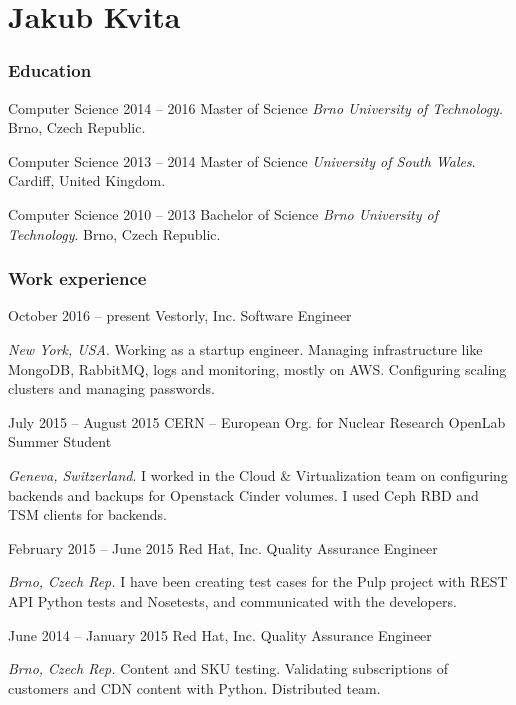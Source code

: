 \documentclass{tccv}
\begin{document}
\part{Jakub Kvita}

\section{Education}

\begin{yearlist}
	
	\item[Computer Science]{2014 -- 2016}
	{Master of Science}
	{\emph{Brno University of Technology}. Brno, Czech Republic.}
	
	\item[Computer Science]{2013 -- 2014}
	{Master of Science}
	{\emph{University of South Wales}. Cardiff, United Kingdom.}
	
	\item[Computer Science]{2010 -- 2013}
	{Bachelor of Science}
	{\emph{Brno University of Technology}. Brno, Czech Republic.}
	
\end{yearlist}

\section{Work experience}

\begin{eventlist}

\item{October 2016 -- present}
{Vestorly, Inc.}
{Software Engineer}

\emph{New York, USA}. Working as a startup engineer. Managing infrastructure like MongoDB, RabbitMQ, logs and monitoring, mostly on AWS. Configuring scaling clusters and managing passwords.

\item{July 2015 -- August 2015}
     {CERN -- European Org. for Nuclear Research}
     {OpenLab Summer Student}

\emph{Geneva, Switzerland}. I worked in the Cloud \& Virtualization team on configuring backends and backups for Openstack Cinder volumes. I used Ceph RBD and TSM clients for backends.

\item{February 2015 -- June 2015}
     {Red Hat, Inc.}
     {Quality Assurance Engineer}

\emph{Brno, Czech Rep.} I have been creating test cases for the Pulp project with REST API Python tests and Nosetests, and communicated with the developers.

\item{June 2014 -- January 2015}
     {Red Hat, Inc.}
     {Quality Assurance Engineer}

\emph{Brno, Czech Rep.} Content and SKU testing. Validating subscriptions of customers and CDN content with Python. Distributed team.

\end{eventlist}
\end{document}
